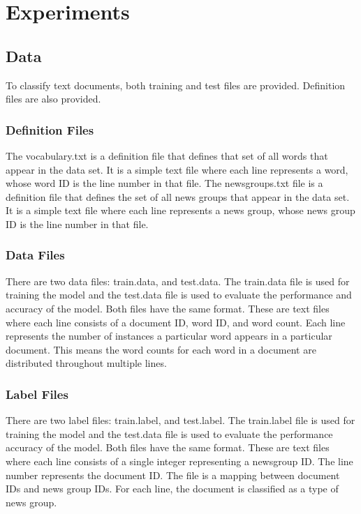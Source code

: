 \documentclass{IEEEtran}
\begin{document}
\section{Experiments}
\subsection{Data}
To classify text documents, both training and test files are provided. Definition files are also provided.

\subsubsection{Definition Files}
The vocabulary.txt is a definition file that defines that set of all words that appear in the data set. It is a simple text file where each line represents a word, whose word ID is the line number in that file. The newsgroups.txt file is a definition file that defines the set of all news groups that appear in the data set. It is a simple text file where each line represents a news group, whose news group ID is the line number in that file.

\subsubsection{Data Files}
There are two data files: train.data, and test.data. The train.data file is used for training the model and the test.data file is used to evaluate the performance and accuracy of the model. Both files have the same format. These are text files where each line consists of a document ID, word ID, and word count. Each line represents the number of instances a particular word appears in a particular document. This means the word counts for each word in a document are distributed throughout multiple lines.

\subsubsection{Label Files}
There are two label files: train.label, and test.label. The train.label file is used for training the model and the test.data file is used to evaluate the performance accuracy of the model. Both files have the same format. These are text files where each line consists of a single integer representing a newsgroup ID. The line number represents the document ID. The file is a mapping between document IDs and news group IDs. For each line, the document is classified as a type of news group.
\end{document}
